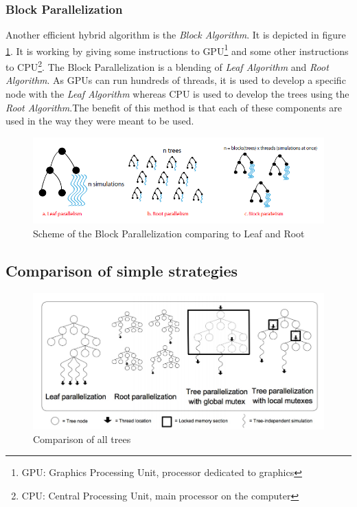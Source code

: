 \subsubsection{Block Parallelization}

Another efficient hybrid algorithm is the \emph{Block Algorithm}\cite{GPU}.  It is depicted in figure \ref{block}. It is working by giving some instructions to GPU\footnote{GPU: Graphics Processing Unit, processor dedicated to graphics} and some other instructions to CPU\footnote{CPU: Central Processing Unit, main processor on the computer}. The Block Parallelization is a blending of \emph{Leaf Algorithm} and \emph{Root Algorithm}. As GPUs can run hundreds of threads, it is used to develop a specific node with the \emph{Leaf Algorithm} whereas CPU is used to develop the trees using the \emph{Root Algorithm}.The benefit of this method is that each of these components are used in the way they were meant to be used.

\begin{figure}[!h] 
\centerline{\includegraphics[scale=0.60]{2_State_of_the_art/Strategy_of_root_parallelization_Mikail/block.png}}
   \caption{\label{étiquette} Scheme of the Block Parallelization comparing to Leaf and Root}
\label{block}
\end{figure}

\subsection{Comparison of simple strategies}
\begin{figure}[!h] 
\centerline{\includegraphics[scale=0.60]{2_State_of_the_art/Strategy_of_root_parallelization_Mikail/impara.png}}
   \caption{\label{étiquette} Comparison of all trees}
\label{comp_algo}
\end{figure}


